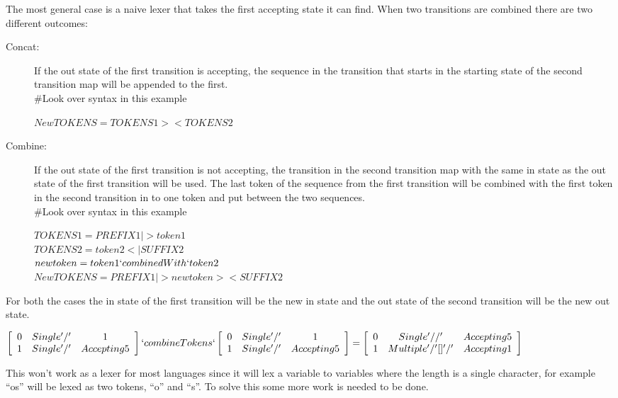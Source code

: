 The most general case is a naive lexer that takes the first accepting state it
can find. When two transitions are combined there are two different outcomes:
\begin{description} 
  \item[Concat:]If the out state of the first transition is accepting, the
    sequence in the transition that starts in the starting state of the second
    transition map will be appended to the first.\\
\#Look over syntax in this example
\begin{center}
$NewTOKENS=TOKENS1 >< TOKENS2$
\end{center}
  \item[Combine:]If the out state of the first transition is not accepting, the
    transition in the second transition map with the same in state as the out
    state of the first transition will be used. The last token of the sequence
    from the first transition will be combined with the first token in the second
    transition in to one token and put between the two sequences.\\
\#Look over syntax in this example
\begin{center}
$TOKENS1=PREFIX1|>token1$\\
$TOKENS2=token2<|SUFFIX2$\\
$newtoken=token1 `combinedWith` token2$\\
$NewTOKENS=PREFIX1 |> newtoken >< SUFFIX2$\\
\end{center}
\end{description}
For both the cases the in state of the first transition will be the new in state
and the out state of the second transition will be the new out state.
\begin{center}
$\left[\begin{array}{ccc}
0&Single '/'&1\\
1&Single '/'&Accepting 5\\
\end{array}\right] `combineTokens`
\left[\begin{array}{ccc}
0&Single '/'&1\\
1&Single '/'&Accepting 5\\
\end{array}\right] =
\left[\begin{array}{ccc}
0&Single '//'&Accepting 5\\
1&Multiple '/' [] '/'&Accepting 1\\
\end{array}\right]$
\end{center}
This won't work as a lexer for most languages since it will lex a variable to
variables where the length is a single character, for example ``os'' will be
lexed as two tokens, ``o'' and ``s''. To solve this some more work is needed to
be done.

